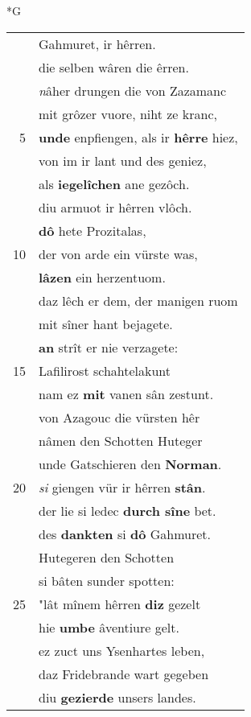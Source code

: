 \documentclass[8pt,a4paper,notitlepage]{article}
\begin{document}
\begin{table}[ht]
\begin{minipage}[t]{0.5\linewidth}
\small
\begin{center}*G
\end{center}
\begin{tabular}{rl}
 & Gahmuret, ir hêrren.\\ 
 & die selben wâren die êrren.\\ 
 & \textit{n}âher drungen die von Zazamanc\\ 
 & mit grôzer vuore, niht ze kranc,\\ 
5 & \textbf{unde} enpfiengen, als ir \textbf{hêrre} hiez,\\ 
 & von im ir lant und des geniez,\\ 
 & als \textbf{iegelîchen} ane gezôch.\\ 
 & diu armuot ir hêrren vlôch.\\ 
 & \textbf{dô} hete Prozitalas,\\ 
10 & der von arde ein vürste was,\\ 
 & \textbf{lâzen} ein herzentuom.\\ 
 & daz lêch er dem, der manigen ruom\\ 
 & mit sîner hant bejagete.\\ 
 & \textbf{an} strît er nie verzagete:\\ 
15 & Lafilirost schahtelakunt\\ 
 & nam ez \textbf{mit} vanen sân zestunt.\\ 
 & von Azagouc die vürsten hêr\\ 
 & nâmen den Schotten Huteger\\ 
 & unde Gatschieren den \textbf{Norman}.\\ 
20 & \textit{si} giengen vür ir hêrren \textbf{stân}.\\ 
 & der lie si ledec \textbf{durch sîne} bet.\\ 
 & des \textbf{dankten} si \textbf{dô} Gahmuret.\\ 
 & Hutegeren den Schotten\\ 
 & si bâten sunder spotten:\\ 
25 & "lât mînem hêrren \textbf{diz} gezelt\\ 
 & hie \textbf{umbe} âventiure gelt.\\ 
 & ez zuct uns Ysenhartes leben,\\ 
 & daz Fridebrande wart gegeben\\ 
 & diu \textbf{gezierde} unsers landes.\\ 

\end{tabular}
\end{minipage}
\end{table}
\end{document}
